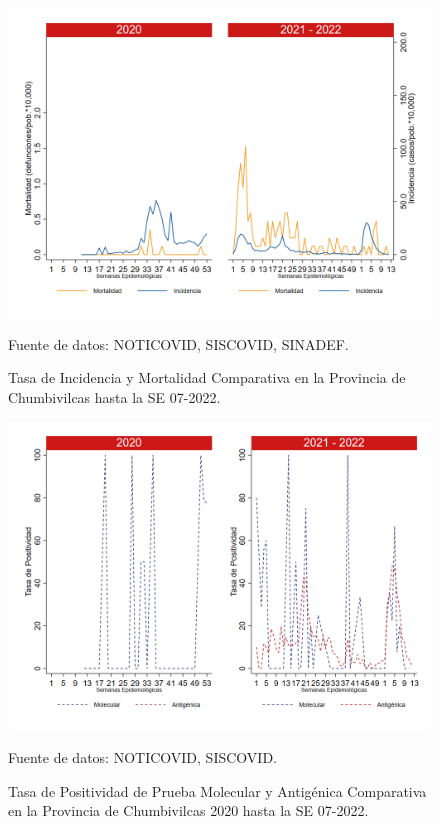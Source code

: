 \documentclass[12pt,a4paper,openany]{book}
\begin{document}
		\begin{figure}[h]
			\caption{Tasa de Incidencia y Mortalidad Comparativa en la Provincia de Chumbivilcas hasta la SE 07-2022.}\label{fig:inc_mort_chumbivilcas}
			\begin{center}
				\includegraphics[width=0.85\linewidth]{../figuras/incidencia_mortalidad_20_21_6.png}
			\end{center}
			{\footnotesize {Fuente de datos: NOTICOVID, SISCOVID, SINADEF.}}
		\end{figure}
		
		\begin{figure}[h]
			\caption{Tasa de Positividad de Prueba Molecular y Antigénica Comparativa en la Provincia de Chumbivilcas 2020 hasta la SE 07-2022.}\label{fig:positividad_chumbivilcas}
			\begin{center}
				\includegraphics[width=0.7\linewidth]{../figuras/positividad_20_21_6.png}
			\end{center}
			{\footnotesize {Fuente de datos: NOTICOVID, SISCOVID.}}
		\end{figure}
		
\end{document}
